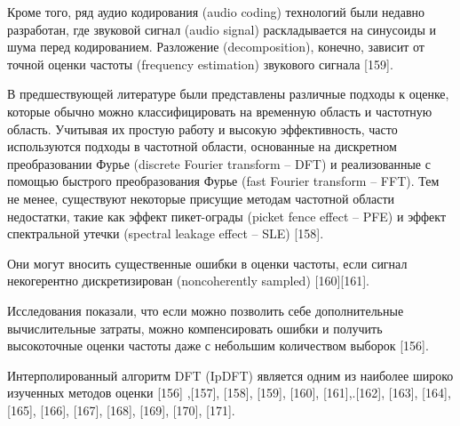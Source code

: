 
Кроме того, ряд аудио кодирования (audio coding) технологий были недавно разработан, где звуковой сигнал (audio signal) раскладывается на синусоиды и шума перед кодированием. Разложение (decomposition), конечно, зависит от точной оценки частоты (frequency estimation) звукового сигнала [159]. 

В предшествующей литературе были представлены различные подходы к оценке, которые обычно можно классифицировать на временную область и частотную область. Учитывая их простую работу и высокую эффективность, часто используются подходы в частотной области, основанные на дискретном преобразовании Фурье (discrete Fourier transform – DFT) и реализованные с помощью быстрого преобразования Фурье (fast Fourier transform – FFT). Тем не менее, существуют некоторые присущие методам частотной области недостатки, такие как эффект пикет-ограды (picket fence effect – PFE) и эффект спектральной утечки (spectral leakage effect – SLE) [158]. 

Они могут вносить существенные ошибки в оценки частоты, если сигнал некогерентно дискретизирован (noncoherently sampled) [160][161].

Исследования показали, что если можно позволить себе дополнительные вычислительные затраты, можно компенсировать ошибки и получить высокоточные оценки частоты даже с небольшим количеством выборок [156].

Интерполированный алгоритм DFT (IpDFT) является одним из наиболее широко изученных методов оценки [156] ,[157], [158], [159], [160], [161],.[162], [163], [164], [165], [166], [167], [168], [169], [170], [171]. 

